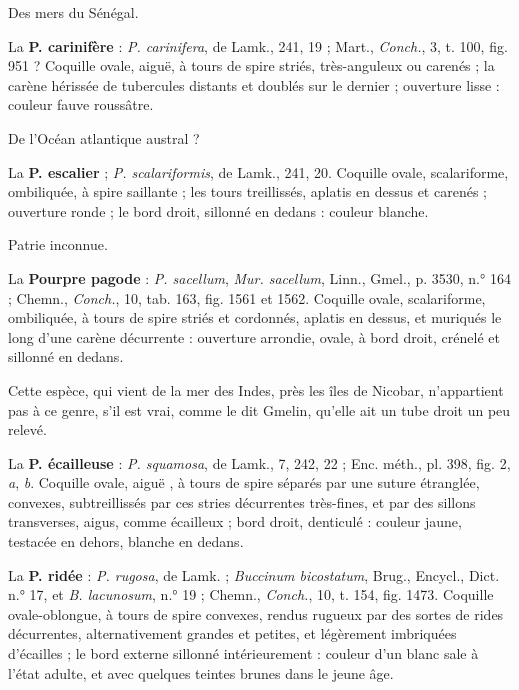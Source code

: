 \documentclass[a4paper, 11pt, oneside, polutonikogreek, french]{article}
\begin{document}
Des mers du Sénégal.

\bigskip

La \textbf{P. carinifère} : \emph{P. carinifera}, de Lamk., 241, 19 ; Mart., \emph{Conch.}, 3, t. 100, fig. 951 ? Coquille ovale, aiguë, à tours de spire striés, très-anguleux ou carenés ; la carène hérissée de tubercules distants et doublés sur le dernier ; ouverture lisse : couleur fauve roussâtre.

De l'Océan atlantique austral ?

\bigskip

La \textbf{P. escalier} ; \emph{P. scalariformis}, de Lamk., 241, 20. Coquille ovale, scalariforme, ombiliquée, à spire saillante ; les tours treillissés, aplatis en dessus et carenés ; ouverture ronde ; le bord droit, sillonné en dedans : couleur blanche.

Patrie inconnue.

\bigskip

La \textbf{Pourpre pagode} : \emph{P. sacellum}, \emph{Mur. sacellum}, Linn., Gmel., p. 3530, n.° 164 ; Chemn., \emph{Conch.}, 10, tab. 163, fig. 1561 et 1562. Coquille ovale, scalariforme, ombiliquée, à tours de spire striés et cordonnés, aplatis en dessus, et muriqués le long d'une carène décurrente : ouverture arrondie, ovale, à bord droit, crénelé et sillonné en dedans.

Cette espèce, qui vient de la mer des Indes, près les îles de Nicobar, n'appartient pas à ce genre, s'il est vrai, comme le dit Gmelin, qu'elle ait un tube droit un peu relevé.

\bigskip

La \textbf{P. écailleuse} : \emph{P. squamosa}, de Lamk., 7, 242, 22 ; Enc. méth., pl. 398, fig. 2, \emph{a}, \emph{b}. Coquille ovale, aiguë , à tours de spire séparés par une suture étranglée, convexes, subtreillissés par ces stries décurrentes très-fines, et par des sillons transverses, aigus, comme écailleux ; bord droit, denticulé : couleur jaune, testacée en dehors, blanche en dedans.

\bigskip

La \textbf{P. ridée} : \emph{P. rugosa}, de Lamk. ; \emph{Buccinum bicostatum}, Brug., Encycl., Dict. n.° 17, et \emph{B. lacunosum}, n.° 19 ; Chemn., \emph{Conch.}, 10, t. 154, fig. 1473. Coquille ovale-oblongue, à tours de spire convexes, rendus rugueux par des sortes de rides décurrentes, alternativement grandes et petites, et légèrement imbriquées d'écailles ; le bord externe sillonné intérieurement : couleur d'un blanc sale à l'état adulte, et avec quelques teintes brunes dans le jeune âge.
\end{document}
